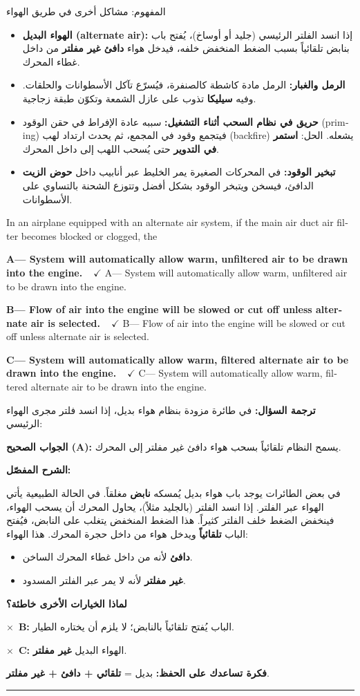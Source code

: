 \documentclass[11pt,a4paper]{article}
\newcommand{\en}[1]{\textenglish{#1}}
\newcommand{\correctletter}{}
\newcommand{\opt}[2]{%
  \ifdefstring{\correctletter}{#1}%
    {\textcolor{ansgreen}{\textbf{#1— #2\ \ $\checkmark$}}}%
    {#1— #2}\par}
\newcommand{\Q}[6]{%
  \renewcommand{\correctletter}{#6}%
  \par\bigskip
  \phantomsection\label{q#1}%
  \begin{tcolorbox}[enhanced,breakable,colback=qback,colframe=qframe,
      arc=2mm,boxrule=0.8pt,fonttitle=\bfseries,
      title={\en{Question #1}}]
    \begin{english}
      #2\par\smallskip
      \opt{A}{#3}\opt{B}{#4}\opt{C}{#5}
    \end{english}
  \end{tcolorbox}}
\newcommand{\tr}[1]{\textbf{\textcolor{qframe}{ترجمة السؤال:}} #1\par}
\newcommand{\ans}[2]{%
  \begin{tcolorbox}[colback=ansback,colframe=ansgreen,boxrule=0.6pt,arc=1.5mm,
      left=4pt,right=4pt,top=2pt,bottom=2pt]
    \textbf{\textcolor{ansgreen}{الجواب الصحيح (\en{#1}):}} #2
  \end{tcolorbox}}
\newcommand{\sharh}[1]{\textbf{\textcolor{conceptc}{الشرح المفصّل:}}\par #1\par}
\newcommand{\nohead}{\textbf{\textcolor{wrongc}{لماذا الخيارات الأخرى خاطئة؟}}\par}
\newcommand{\no}[2]{\hspace*{1em}\textcolor{wrongc}{$\times$}\ \textbf{\en{#1}:} #2\par}
\newcommand{\tip}[1]{%
  \begin{tcolorbox}[colback=tipback,colframe=tipframe,boxrule=0.5pt,arc=1.5mm,
      left=4pt,right=4pt,top=2pt,bottom=2pt]
    \textbf{فكرة تساعدك على الحفظ:} #1
  \end{tcolorbox}}
\newcommand{\qsep}{\par\medskip\noindent\textcolor{qframe!40}{\rule{\linewidth}{0.4pt}}\par}
\begin{document}
\begin{concept}{المفهوم: مشاكل أخرى في طريق الهواء}
\begin{itemize}
  \item \textbf{الهواء البديل (\en{alternate air}):} إذا انسد الفلتر الرئيسي (جليد أو أوساخ)، يُفتح باب بنابض تلقائياً بسبب الضغط المنخفض خلفه، فيدخل هواء \textbf{دافئ غير مفلتر} من داخل غطاء المحرك.
  \item \textbf{الرمل والغبار:} الرمل مادة كاشطة كالصنفرة، فيُسرّع تآكل الأسطوانات والحلقات. وفيه \textbf{سيليكا} تذوب على عازل الشمعة وتكوّن طبقة زجاجية.
  \item \textbf{حريق في نظام السحب أثناء التشغيل:} سببه عادة الإفراط في حقن الوقود (\en{priming}) فيتجمع وقود في المجمع، ثم يحدث ارتداد لهب (\en{backfire}) يشعله. الحل: \textbf{استمر في التدوير} حتى يُسحب اللهب إلى داخل المحرك.
  \item \textbf{تبخير الوقود:} في المحركات الصغيرة يمر الخليط عبر أنابيب داخل \textbf{حوض الزيت} الدافئ، فيسخن ويتبخر الوقود بشكل أفضل وتتوزع الشحنة بالتساوي على الأسطوانات.
\end{itemize}
\end{concept}

\Q{8809}{In an airplane equipped with an alternate air system, if the main air duct air filter becomes blocked or clogged, the}
{System will automatically allow warm, unfiltered air to be drawn into the engine.}
{Flow of air into the engine will be slowed or cut off unless alternate air is selected.}
{System will automatically allow warm, filtered alternate air to be drawn into the engine.}{A}
\tr{في طائرة مزودة بنظام هواء بديل، إذا انسد فلتر مجرى الهواء الرئيسي:}
\ans{A}{يسمح النظام تلقائياً بسحب هواء دافئ غير مفلتر إلى المحرك.}
\sharh{في بعض الطائرات يوجد باب هواء بديل يُمسكه \textbf{نابض} مغلقاً. في الحالة الطبيعية يأتي الهواء عبر الفلتر. إذا انسد الفلتر (بالجليد مثلاً)، يحاول المحرك أن يسحب الهواء، فينخفض الضغط خلف الفلتر كثيراً. هذا الضغط المنخفض يتغلب على النابض، فيُفتح الباب \textbf{تلقائياً} ويدخل هواء من داخل حجرة المحرك. هذا الهواء:
\begin{itemize}
  \item \textbf{دافئ} لأنه من داخل غطاء المحرك الساخن.
  \item \textbf{غير مفلتر} لأنه لا يمر عبر الفلتر المسدود.
\end{itemize}}
\nohead
\no{B}{الباب يُفتح تلقائياً بالنابض؛ لا يلزم أن يختاره الطيار.}
\no{C}{الهواء البديل \textbf{غير مفلتر}.}
\tip{بديل = \textbf{تلقائي + دافئ + غير مفلتر}.}
\qsep
\end{document}
